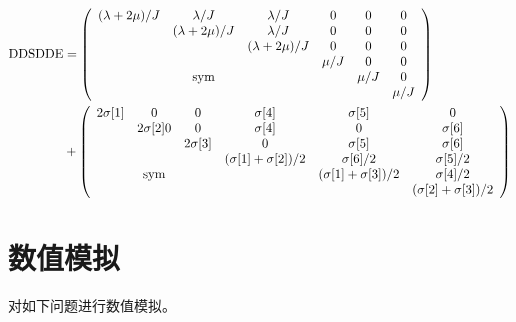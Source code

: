 \documentclass{article}
\begin{document}
\begin{equation}
\begin{aligned}
    {\rm DDSDDE}&=\left(
    \begin{array}{cccccc}
            (\lambda + 2\mu)/J & \lambda/J          & \lambda/J          & 0     & 0     & 0     \\
                               & (\lambda + 2\mu)/J & \lambda/J          & 0     & 0     & 0     \\
                               &                    & (\lambda + 2\mu)/J & 0     & 0     & 0     \\
                               &                    &                    & \mu/J & 0     & 0     \\
                               & {\rm sym}          &                    &       & \mu/J & 0     \\
                               &                    &                    &       &       & \mu/J \\
        \end{array}
    \right)\\
    &+
    \left(
    \begin{array}{cccccc}
            2\sigma[1] & 0            & 0          & \sigma[4]               & \sigma[5]               & 0                       \\
                       & 2\sigma[2] 0 & 0          & \sigma[4]               & 0                       & \sigma[6]               \\
                       &              & 2\sigma[3] & 0                       & \sigma[5]               & \sigma[6]               \\
                       &              &            & (\sigma[1]+\sigma[2])/2 & \sigma[6]/2             & \sigma[5]/2             \\
                       & {\rm sym}    &            &                         & (\sigma[1]+\sigma[3])/2 & \sigma[4]/2             \\
                       &              &            &                         &                         & (\sigma[2]+\sigma[3])/2 \\
        \end{array}
    \right)
\end{aligned}
\label{mmme}
\end{equation}

\section{数值模拟}
对如下问题进行数值模拟。
\end{document}
